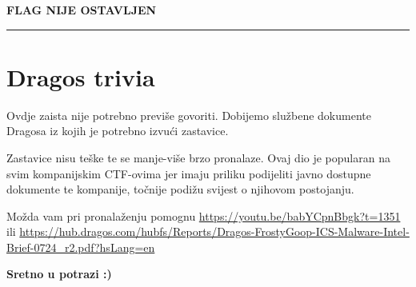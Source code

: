 \documentclass{article}
\begin{document}
\begin{center}
    \textbf{FLAG NIJE OSTAVLJEN}    
\end{center}

\noindent\rule{\textwidth}{0.4pt}

\newpage
\section{Dragos trivia}
\label{sec:trivia}

Ovdje zaista nije potrebno previše govoriti. Dobijemo službene dokumente Dragosa iz kojih je potrebno izvući zastavice.

Zastavice nisu teške te se manje-više brzo pronalaze. Ovaj dio je popularan na svim kompanijskim CTF-ovima jer
imaju priliku podijeliti javno dostupne dokumente te kompanije, točnije podižu svijest o njihovom postojanju.

Možda vam pri pronalaženju pomognu \url{https://youtu.be/babYCpnBbgk?t=1351} ili \url{https://hub.dragos.com/hubfs/Reports/Dragos-FrostyGoop-ICS-Malware-Intel-Brief-0724_r2.pdf?hsLang=en}
\newline
\newline
\begin{center}
    \textbf{Sretno u potrazi :)}
\end{center}
\newpage
\end{document}
